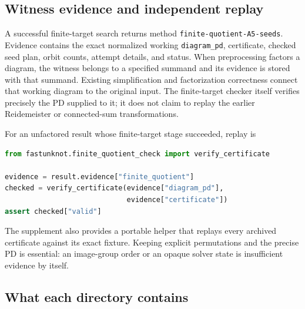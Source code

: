 \subsection{Witness evidence and independent replay}

A successful finite-target search returns method
\texttt{finite-quotient-A5-seeds}. Evidence contains the exact normalized
working \texttt{diagram\_pd}, certificate, checked seed plan, orbit counts,
attempt details, and status. When preprocessing factors a diagram,
the witness belongs to a specified summand and its evidence is stored
with that summand. Existing simplification and factorization correctness
connect that working diagram to the original input. The finite-target
checker itself verifies precisely the PD supplied to it; it does not
claim to replay the earlier Reidemeister or connected-sum transformations.

For an unfactored result whose finite-target stage succeeded, replay is
\begin{lstlisting}[language=Python]
from fastunknot.finite_quotient_check import verify_certificate

evidence = result.evidence["finite_quotient"]
checked = verify_certificate(evidence["diagram_pd"],
                             evidence["certificate"])
assert checked["valid"]
\end{lstlisting}
The supplement also provides a portable helper that replays every
archived certificate against its exact fixture. Keeping explicit
permutations and the precise PD is essential: an image-group order or
an opaque solver state is insufficient evidence by itself.

\subsection{What each directory contains}

